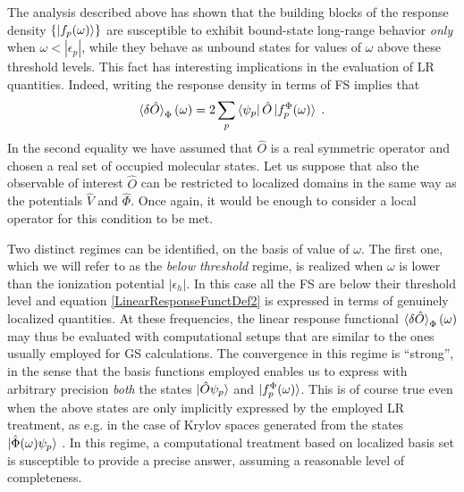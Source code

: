 \documentclass[reprint,aps,prb]{revtex4-1}
\newcommand{\eps}{\epsilon}
\newcommand{\be}{\begin{equation}}
\newcommand{\ee}{\end{equation}}
\newcommand{\lb}{\label}
\newcommand{\op}[1]{\hat {#1}}
\begin{document}
The analysis described above has shown that the building blocks of the response density $\{\ket{f_p(\omega)}\}$
are susceptible to exhibit bound-state long-range behavior \emph{only} when $\omega < |\eps_p|$,
while they behave as unbound states for values of $\omega$ above these threshold levels.
This fact has interesting implications in the evaluation of LR quantities. Indeed, writing the response
density in terms of FS implies that 
\be\lb{LinearResponseFunctDef2}
\braket{\delta\op O}_\Phi(\omega) = 2 \sum_p\bra{\psi_p}\op O\ket{f_p^\Phi(\omega)}  \;.
\ee
In the second equality we have assumed that $\op O$ is a real symmetric operator and chosen a real set of occupied molecular states.
Let us suppose that also the observable of interest $\op O$ can be restricted to localized domains in the same way as the potentials $ \op V$ and $\op \Phi$.
Once again, it would be enough to consider a local operator for this condition to be met.

Two distinct regimes can be identified, on the basis of value of $\omega$.
The first one, which we will refer to as the \emph{below threshold} regime, is realized when
$\omega$ is lower than the ionization potential $|\eps_h|$.
In this case all the FS are below their threshold level and equation \eqref{LinearResponseFunctDef2}
is expressed in terms of genuinely localized
quantities. At these frequencies, the linear response functional $\braket{\delta\op O}_\Phi(\omega)$
may thus be evaluated with computational setups that
are similar to the ones usually employed for GS calculations.
The convergence in this regime is ``strong'', in the sense that the basis functions employed enables us to express
with arbitrary precision \emph{both} the states $\ket{\op O \psi_p}$ and $\ket{f_p^\Phi(\omega)}$.
This is of course true even when the above states are only implicitly expressed by the employed LR treatment,
 as e.g. in the case of Krylov spaces generated from the states $\ket{\op\Phi(\omega) \psi_p}$ \cite{baroni2006,baroni2008,linlinKPM}.
 In this regime, a computational treatment based on localized basis set is susceptible to provide a precise answer, assuming a reasonable level of completeness.
\end{document}

